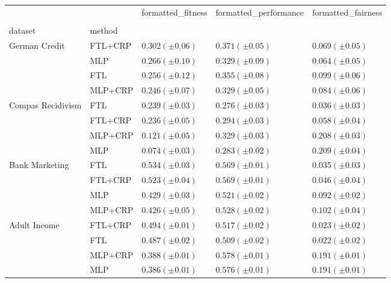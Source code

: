 \begin{tabular}{lllll}
\toprule
 &  & formatted_fitness & formatted_performance & formatted_fairness \\
 &  &  &  &  \\
dataset & method &  &  &  \\
\midrule
\multirow[t]{4}{*}{German Credit} & FTL+CRP & $0.302 (\pm0.06)$ & $0.371 (\pm0.05)$ & $0.069 (\pm0.05)$ \\
 & MLP & $0.266 (\pm0.10)$ & $0.329 (\pm0.09)$ & $0.064 (\pm0.05)$ \\
 & FTL & $0.256 (\pm0.12)$ & $0.355 (\pm0.08)$ & $0.099 (\pm0.06)$ \\
 & MLP+CRP & $0.246 (\pm0.07)$ & $0.329 (\pm0.05)$ & $0.084 (\pm0.06)$ \\
\cline{1-5}
\multirow[t]{4}{*}{Compas Recidivism} & FTL & $0.239 (\pm0.03)$ & $0.276 (\pm0.03)$ & $0.036 (\pm0.03)$ \\
 & FTL+CRP & $0.236 (\pm0.05)$ & $0.294 (\pm0.03)$ & $0.058 (\pm0.04)$ \\
 & MLP+CRP & $0.121 (\pm0.05)$ & $0.329 (\pm0.03)$ & $0.208 (\pm0.03)$ \\
 & MLP & $0.074 (\pm0.03)$ & $0.283 (\pm0.02)$ & $0.209 (\pm0.04)$ \\
\cline{1-5}
\multirow[t]{4}{*}{Bank Marketing} & FTL & $0.534 (\pm0.03)$ & $0.569 (\pm0.01)$ & $0.035 (\pm0.03)$ \\
 & FTL+CRP & $0.523 (\pm0.04)$ & $0.569 (\pm0.01)$ & $0.046 (\pm0.04)$ \\
 & MLP & $0.429 (\pm0.03)$ & $0.521 (\pm0.02)$ & $0.092 (\pm0.02)$ \\
 & MLP+CRP & $0.426 (\pm0.05)$ & $0.528 (\pm0.02)$ & $0.102 (\pm0.04)$ \\
\cline{1-5}
\multirow[t]{4}{*}{Adult Income} & FTL+CRP & $0.494 (\pm0.01)$ & $0.517 (\pm0.02)$ & $0.023 (\pm0.02)$ \\
 & FTL & $0.487 (\pm0.02)$ & $0.509 (\pm0.02)$ & $0.022 (\pm0.02)$ \\
 & MLP+CRP & $0.388 (\pm0.01)$ & $0.578 (\pm0.01)$ & $0.191 (\pm0.01)$ \\
 & MLP & $0.386 (\pm0.01)$ & $0.576 (\pm0.01)$ & $0.191 (\pm0.01)$ \\
\cline{1-5}
\bottomrule
\end{tabular}
